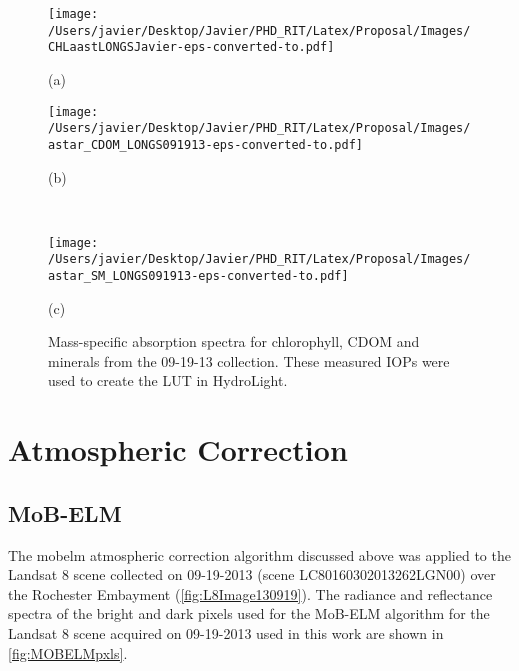 \begin{figure}[htb]
    \begin{minipage}[c]{0.48\linewidth}
      \centering
    \texttt{[image: /Users/javier/Desktop/Javier/PHD\_RIT/Latex/Proposal/Images/CHLaastLONGSJavier-eps-converted-to.pdf]}
     \centerline{(a)}\medskip
    \end{minipage}
    \hfill
    \begin{minipage}[d]{0.48\linewidth}
      \centering
    \texttt{[image: /Users/javier/Desktop/Javier/PHD\_RIT/Latex/Proposal/Images/astar\_CDOM\_LONGS091913-eps-converted-to.pdf]}
     \centerline{(b)}\medskip
    \end{minipage}\\
    
    \begin{minipage}[d]{1.0\linewidth}
      \centering
    \texttt{[image: /Users/javier/Desktop/Javier/PHD\_RIT/Latex/Proposal/Images/astar\_SM\_LONGS091913-eps-converted-to.pdf]}
      \centerline{(c)}\medskip
    \end{minipage}
  \caption{Mass-specific absorption spectra for chlorophyll, CDOM and minerals from the 09-19-13 collection. These measured IOPs were used to create the LUT in HydroLight. \label{fig:IOPastLONGS} }  
\end{figure}

\section{Atmospheric Correction}
\subsection{MoB-ELM}

The \gls{mobelm} atmospheric correction algorithm discussed above was applied to the Landsat 8 scene collected on 09-19-2013 (scene LC80160302013262LGN00) over the Rochester Embayment (\autoref{fig:L8Image130919}). The radiance and reflectance spectra of the bright and dark pixels used for the MoB-ELM algorithm for the Landsat 8 scene acquired on 09-19-2013 used in this work are shown in \autoref{fig:MOBELMpxls}. 

